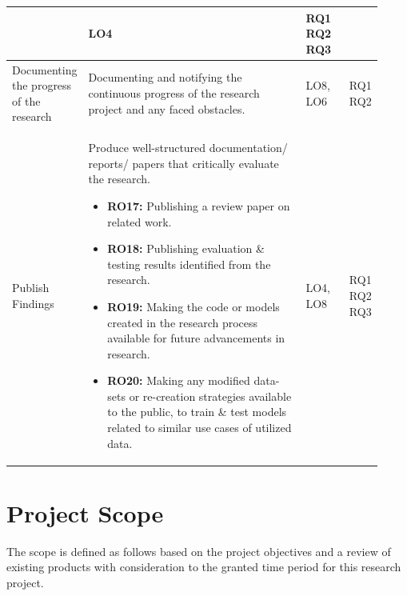 \begin{longtable}{| p{0.135\linewidth} | p{0.63\linewidth}| p{0.12\linewidth}| p{0.04\linewidth}|}
\begin{itemize}
\vspace{-7mm}       %
\end{itemize}
& LO4
& RQ1 RQ2 RQ3
\\
\hline
Documenting the progress of the research & Documenting and notifying the continuous progress of the research project and any faced obstacles. 
& LO8, LO6
& RQ1 RQ2
\\
\hline
Publish Findings & Produce well-structured documentation/ reports/ papers that critically evaluate the research.
\begin{itemize}
\item \textbf{RO17:} Publishing a review paper on related work.
\item \textbf{RO18:} Publishing evaluation \& testing results identified from the research.
\item \textbf{RO19:} Making the code or models created in the research process available for future advancements in research.
\item \textbf{RO20:} Making any modified data-sets or re-creation strategies available to the public, to train \& test models related to similar use cases of utilized data.
\vspace{-7mm}       %
\end{itemize}
& LO4, LO8
& RQ1 RQ2 RQ3
\\
\hline
\end{longtable}


\section{Project Scope}
The scope is defined as follows based on the project objectives and a review of existing products with consideration to the granted time period for this research project.

